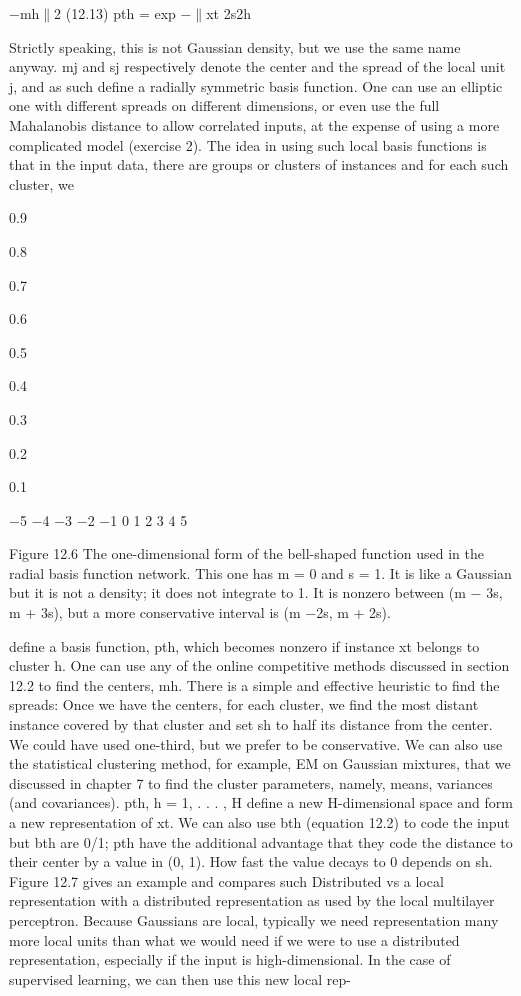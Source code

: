 $-$mh$\parallel$2 (12.13) pth = exp $-$$\parallel$xt 2s2h

Strictly speaking, this is not Gaussian density, but we use the same name anyway. mj and sj respectively denote the center and the spread of the local unit j, and as such define a radially symmetric basis function. One can use an elliptic one with different spreads on different dimensions, or even use the full Mahalanobis distance to allow correlated inputs, at the expense of using a more complicated model (exercise 2). The idea in using such local basis functions is that in the input data, there are groups or clusters of instances and for each such cluster, we

0.9

0.8

0.7

0.6

0.5

0.4

0.3

0.2

0.1

$-$5 $-$4 $-$3 $-$2 $-$1 0 1 2 3 4 5

Figure 12.6 The one-dimensional form of the bell-shaped function used in the radial basis function network. This one has m = 0 and s = 1. It is like a Gaussian but it is not a density; it does not integrate to 1. It is nonzero between (m $-$ 3s, m + 3s), but a more conservative interval is (m $-$2s, m + 2s).

define a basis function, pth, which becomes nonzero if instance xt belongs to cluster h. One can use any of the online competitive methods discussed in section 12.2 to find the centers, mh. There is a simple and effective heuristic to find the spreads: Once we have the centers, for each cluster, we find the most distant instance covered by that cluster and set sh to half its distance from the center. We could have used one-third, but we prefer to be conservative. We can also use the statistical clustering method, for example, EM on Gaussian mixtures, that we discussed in chapter 7 to find the cluster parameters, namely, means, variances (and covariances). pth, h = 1, . . . , H define a new H-dimensional space and form a new representation of xt. We can also use bth (equation 12.2) to code the input but bth are 0/1; pth have the additional advantage that they code the distance to their center by a value in (0, 1). How fast the value decays to 0 depends on sh. Figure 12.7 gives an example and compares such Distributed vs a local representation with a distributed representation as used by the local multilayer perceptron. Because Gaussians are local, typically we need representation many more local units than what we would need if we were to use a distributed representation, especially if the input is high-dimensional. In the case of supervised learning, we can then use this new local rep-

